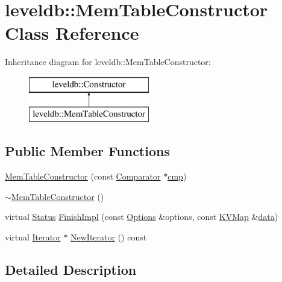 \hypertarget{classleveldb_1_1_mem_table_constructor}{}\section{leveldb\+:\+:Mem\+Table\+Constructor Class Reference}
\label{classleveldb_1_1_mem_table_constructor}
Inheritance diagram for leveldb\+:\+:Mem\+Table\+Constructor\+:\begin{figure}[H]
\begin{center}
\leavevmode
\includegraphics[height=2.000000cm]{classleveldb_1_1_mem_table_constructor}
\end{center}
\end{figure}
\subsection*{Public Member Functions}
\begin{DoxyCompactItemize}
\item 
\hyperlink{classleveldb_1_1_mem_table_constructor_a5f4c341eb97e6e3938ec05b98455664a}{Mem\+Table\+Constructor} (const \hyperlink{structleveldb_1_1_comparator}{Comparator} $\ast$\hyperlink{table__test_8cc_a87863e435922f0910ca8db43f02a6c0b}{cmp})
\item 
\hyperlink{classleveldb_1_1_mem_table_constructor_a893a3f902a8dbbe7c2548c3ab46512c1}{$\sim$\+Mem\+Table\+Constructor} ()
\item 
virtual \hyperlink{classleveldb_1_1_status}{Status} \hyperlink{classleveldb_1_1_mem_table_constructor_a78851e48bd187f231934e128ab050624}{Finish\+Impl} (const \hyperlink{structleveldb_1_1_options}{Options} \&options, const \hyperlink{namespaceleveldb_aac1e50450147be263e08252c6700f7a7}{K\+V\+Map} \&\hyperlink{classleveldb_1_1_constructor_a55a0363200d6e86d8beb3b15b75e3824}{data})
\item 
virtual \hyperlink{classleveldb_1_1_iterator}{Iterator} $\ast$ \hyperlink{classleveldb_1_1_mem_table_constructor_ae6eca097713c07eed6f630cca780fedd}{New\+Iterator} () const 
\end{DoxyCompactItemize}


\subsection{Detailed Description}



